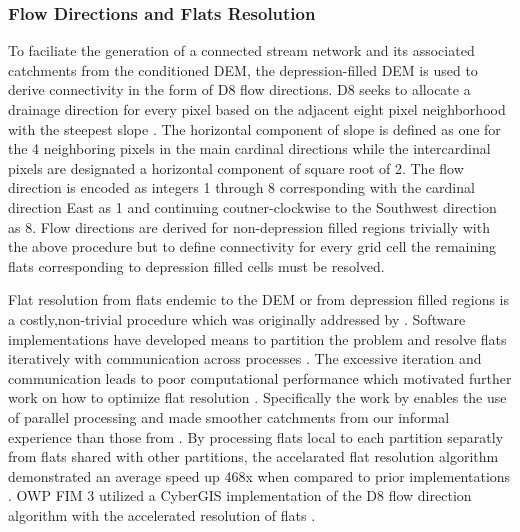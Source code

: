 \subsubsection{Flow Directions and Flats Resolution}
\label{ssec:flow_direction_and_flat_resolution}

To faciliate the generation of a connected stream network and its associated catchments from the conditioned DEM, the depression-filled DEM is used to derive connectivity in the form of D8 flow directions.
D8 seeks to allocate a drainage direction for every pixel based on the adjacent eight pixel neighborhood with the steepest slope \cite{o1984extraction}.
The horizontal component of slope is defined as one for the 4 neighboring pixels in the main cardinal directions while the intercardinal pixels are designated a horizontal component of square root of 2. 
The flow direction is encoded as integers 1 through 8 corresponding with the cardinal direction East as 1 and continuing coutner-clockwise to the Southwest direction as 8. 
Flow directions are derived for non-depression filled regions trivially with the above procedure but to define connectivity for every grid cell the remaining flats corresponding to depression filled cells must be resolved.


Flat resolution from flats endemic to the DEM or from depression filled regions is a costly,non-trivial procedure which was originally addressed by .  
Software implementations have developed means to partition the problem and resolve flats iteratively with communication across processes \cite{tarboton2009generalized,tesfa2011extraction,wallis2009parallel,tarboton2005terrain}.
The excessive iteration and communication leads to poor computational performance which motivated further work on how to optimize flat resolution \cite{survila2016scalable,barnes2014efficient}.
Specifically the work by  enables the use of parallel processing and made smoother catchments from our informal experience than those from .
By processing flats local to each partition separatly from flats shared with other partitions, the accelarated flat resolution algorithm demonstrated an average speed up 468x when compared to prior implementations \cite{survila2016scalable}.
OWP FIM 3 utilized a CyberGIS implementation of the D8 flow direction algorithm with the accelerated resolution of flats \cite{survila2016scalable,cybergis2016}.


